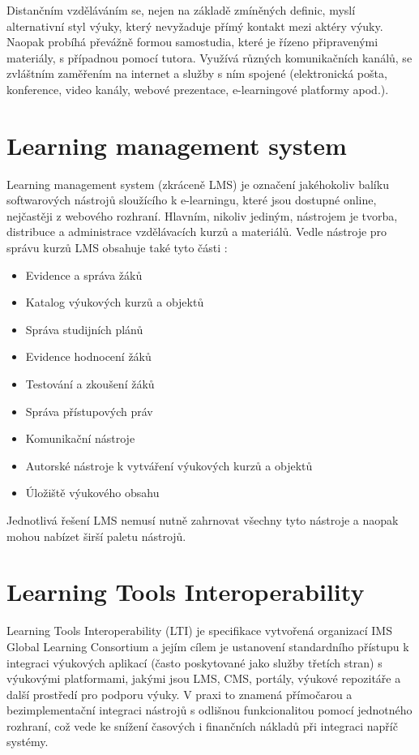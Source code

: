 \documentclass[
print,
  11pt,
  table,   
  nolof,    
  nolot,
  oneside,
  final
]{fithesis3}
\begin{document}
Distančním vzděláváním se, nejen na základě zmíněných definic, myslí alternativní styl výuky, který nevyžaduje přímý kontakt mezi aktéry výuky. Naopak probíhá převážně formou samostudia, které je řízeno připravenými materiály, s případnou pomocí tutora. Využívá různých komunikačních kanálů, se zvláštním zaměřením na internet a služby s ním spojené (elektronická pošta, konference, video kanály, webové prezentace, e-learningové platformy apod.).


	\section{Learning management system}
Learning management system (zkráceně LMS) je označení jakéhokoliv balíku softwarových nástrojů sloužícího k e-learningu, které jsou dostupné online, nejčastěji z webového rozhraní. Hlavním, nikoliv jediným, nástrojem je tvorba, distribuce a administrace vzdělávacích kurzů a materiálů. Vedle nástroje pro správu kurzů LMS obsahuje také tyto části \cite{lms}:
\begin{itemize}
	\item Evidence a správa žáků
	\item Katalog výukových kurzů a objektů
	\item Správa studijních plánů
	\item Evidence hodnocení žáků
	\item Testování a zkoušení žáků
	\item Správa přístupových práv
	\item Komunikační nástroje
	\item Autorské nástroje k vytváření výukových kurzů a objektů
	\item Úložiště výukového obsahu
\end{itemize}
Jednotlivá řešení LMS nemusí nutně zahrnovat všechny tyto nástroje a naopak mohou nabízet širší paletu nástrojů.

	\section{Learning Tools Interoperability}
Learning Tools Interoperability (LTI) je specifikace vytvořená organizací IMS Global Learning Consortium a jejím cílem je ustanovení standardního přístupu k integraci výukových aplikací (často poskytované jako služby třetích stran) s výukovými platformami, jakými jsou LMS, CMS, portály, výukové repozitáře a další prostředí pro podporu výuky. V praxi to znamená přímočarou a bezimplementační integraci nástrojů s odlišnou funkcionalitou pomocí jednotného rozhraní, což vede ke snížení časových i finančních nákladů při integraci napříč systémy. \cite{imslti}
\end{document}
